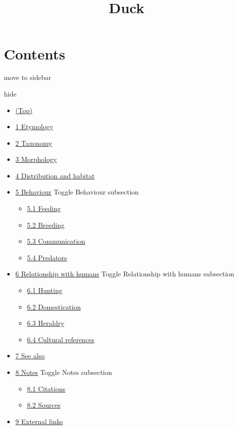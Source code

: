 \documentclass[11pt,a4paper]{article}
\title{Duck}
\begin{document}
\maketitle

\section{Contents}

move to sidebar

hide

\begin{itemize}
\item \href{\#}{(Top)}
\item \href{\#Etymology}{1 Etymology}
\item \href{\#Taxonomy}{2 Taxonomy}
\item \href{\#Morphology}{3 Morphology}
\item \href{\#Distribution\_and\_habitat}{4 Distribution and habitat}
\item \href{\#Behaviour}{5 Behaviour} Toggle Behaviour subsection
  \begin{itemize}
\item \href{\#Feeding}{5.1 Feeding}
\item \href{\#Breeding}{5.2 Breeding}
\item \href{\#Communication}{5.3 Communication}
\item \href{\#Predators}{5.4 Predators}
  \end{itemize}
\item \href{\#Relationship\_with\_humans}{6 Relationship with humans} Toggle Relationship with humans subsection
  \begin{itemize}
\item \href{\#Hunting}{6.1 Hunting}
\item \href{\#Domestication}{6.2 Domestication}
\item \href{\#Heraldry}{6.3 Heraldry}
\item \href{\#Cultural\_references}{6.4 Cultural references}
  \end{itemize}
\item \href{\#See\_also}{7 See also}
\item \href{\#Notes}{8 Notes} Toggle Notes subsection
  \begin{itemize}
\item \href{\#Citations}{8.1 Citations}
\item \href{\#Sources}{8.2 Sources}
  \end{itemize}
\item \href{\#External\_links}{9 External links}
\end{itemize}
\end{document}
